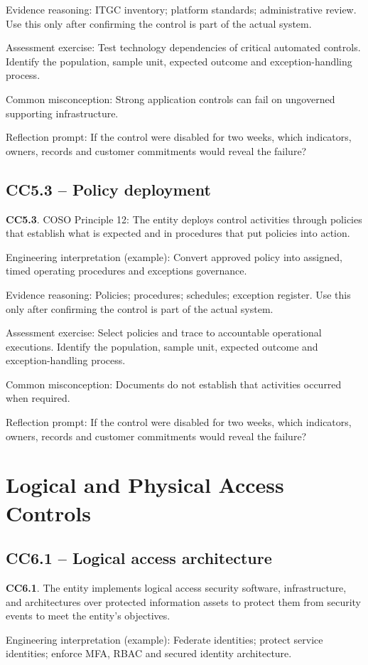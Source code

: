 \documentclass[10pt,oneside]{report}
\begin{document}
Evidence reasoning: ITGC inventory; platform standards; administrative review. Use this only after confirming the control is part of the actual system.

Assessment exercise: Test technology dependencies of critical automated controls. Identify the population, sample unit, expected outcome and exception-handling process.

Common misconception: Strong application controls can fail on ungoverned supporting infrastructure.

Reflection prompt: If the control were disabled for two weeks, which indicators, owners, records and customer commitments would reveal the failure?

\subsection{CC5.3 -- Policy deployment}
\begin{aicpabox}
\textbf{CC5.3}. COSO Principle 12: The entity deploys control activities through policies that establish what is expected and in procedures that put policies into action.\par{}
\end{aicpabox}
Engineering interpretation (example): Convert approved policy into assigned, timed operating procedures and exceptions governance.

Evidence reasoning: Policies; procedures; schedules; exception register. Use this only after confirming the control is part of the actual system.

Assessment exercise: Select policies and trace to accountable operational executions. Identify the population, sample unit, expected outcome and exception-handling process.

Common misconception: Documents do not establish that activities occurred when required.

Reflection prompt: If the control were disabled for two weeks, which indicators, owners, records and customer commitments would reveal the failure?

\section{Logical and Physical Access Controls}
\subsection{CC6.1 -- Logical access architecture}
\begin{aicpabox}
\textbf{CC6.1}. The entity implements logical access security software, infrastructure, and architectures over protected information assets to protect them from security events to meet the entity's objectives.\par{}
\end{aicpabox}
Engineering interpretation (example): Federate identities; protect service identities; enforce MFA, RBAC and secured identity architecture.
\end{document}

